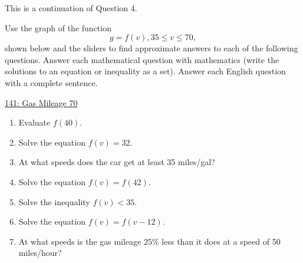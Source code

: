 \documentclass{ximera}
\begin{document}
\begin{question}  \label{QFun354}
This is a continuation of Question 4. 

Use the graph of the function 
\[
    g = f(v) , 35\leq v \leq 70 ,
\]
shown below and the sliders to find approximate answers to each of the following questions. Answer each mathematical question with mathematics (write the solutions to an equation or inequality as a set). Answer each English question with a complete sentence.
 
\begin{onlineOnly}
    \begin{center}
\end{center}
\end{onlineOnly}

\href{https://www.desmos.com/calculator/mly7wxfxtj}{141: Gas Mileage 70}

\begin{enumerate}

\item Evaluate $f(40)$. 

\item  Solve the equation $f(v)=32$.

\item  At what speeds does the car get at least 35 miles/gal?

\item  Solve the equation $f(v)=f(42)$.

\item Solve the inequality $f(v) <35$.

\item Solve the equation $f(v) = f(v-12)$.

\item  At what speeds is the gas mileage $25\%$ less than it does at a speed of 50 miles/hour?

\end{enumerate}

\end{question}
\end{document}
